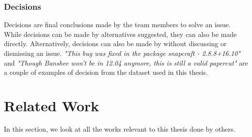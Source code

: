 \documentclass[a4paper,12pt,twoside]{report}
\begin{document}
\subsubsection{Decisions}
Decisions are final conclusions made by the team members to solve an issue. While decisions can be made by alternatives suggested, they can also be made directly. Alternatively, decisions can also be made by without discussing or dismissing an issue. \textit{"This bug was fixed in the package snapcraft - 2.8.8+16.10"} and \textit{"Though Banshee won't be in 12.04 anymore, this is still a valid papercut"} are a couple of examples of decision from the dataset used in this thesis.


\section{Related Work}

In this section, we look at all the works relevant to this thesis done by others. 
\end{document}
